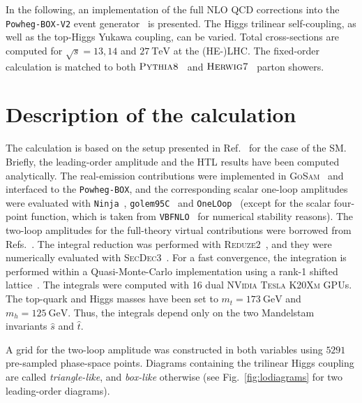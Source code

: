 \documentclass[a4paper]{jpconf}
\newcommand{\GeV}{\ensuremath{\mathrm{\:GeV}}}
\newcommand{\TeV}{\ensuremath{\mathrm{\:TeV}}}
\newcommand{\pythia}{\textsc{Pythia8}}
\newcommand{\herwig}{\textsc{Herwig7}}
\begin{document}
In the following, an implementation of the full NLO QCD corrections into the \texttt{Powheg-BOX-V2} event generator~\cite{Nason:2004rx,Frixione:2007vw,Alioli:2010xd} is presented. The Higgs trilinear self-coupling, as well as the top-Higgs Yukawa coupling, can be varied. Total cross-sections are computed for $\sqrt{s}=13,14$ and $27 \TeV$ at the (HE-)LHC. The fixed-order calculation is matched to both $\pythia$~\cite{Sjostrand:2014zea} and $\herwig$~\cite{Bellm:2017bvx} parton showers.

\section{Description of the calculation}

The calculation is based on the setup presented in Ref.~\cite{Heinrich:2017kxx} for the case of the SM. Briefly, the leading-order amplitude and the HTL results have been computed analytically. The real-emission contributions were implemented in \textsc{GoSam}~\cite{Cullen:2011ac,Cullen:2014yla} and interfaced to the \texttt{Powheg-BOX}, and the corresponding scalar one-loop amplitudes were evaluated with \texttt{Ninja}~\cite{Peraro:2014cba}, \texttt{golem95C}~\cite{Binoth:2008uq,Cullen:2011kv} and \texttt{OneLOop}~\cite{vanHameren:2010cp} (except for the scalar four-point function, which is taken from \texttt{VBFNLO}~\cite{Arnold:2008rz,Baglio:2014uba} for numerical stability reasons).
The two-loop amplitudes for the full-theory virtual contributions were borrowed from Refs.~\cite{Borowka:2016ehy,Borowka:2016ypz}. The integral reduction was performed with \textsc{Reduze2}~\cite{vonManteuffel:2012np}, and they were numerically evaluated with \textsc{SecDec3}~\cite{Borowka:2015mxa}. For a fast convergence, the integration is performed within a Quasi-Monte-Carlo implementation using a rank-1 shifted lattice~\cite{Borowka:2018goh,Jones:2016bci}. The integrals were computed with 16 dual \textsc{NVidia Tesla K20Xm} GPUs. The top-quark and Higgs masses have been set to $m_t=173 \GeV$ and $m_h = 125 \GeV$. Thus, the integrals depend only on the two Mandelstam invariants $\hat{s}$ and $\hat{t}$.

A grid for the two-loop amplitude was constructed in both variables using $5291$ pre-sampled phase-space points. %
Diagrams containing the trilinear Higgs coupling are called \textit{triangle-like}, and \textit{box-like} otherwise (see Fig.~\ref{fig:lodiagrams} for two leading-order diagrams). 
\end{document}
